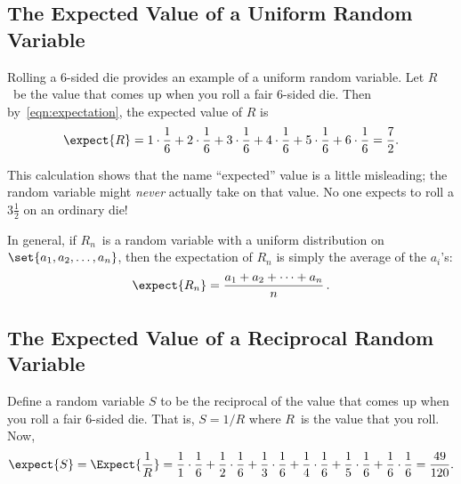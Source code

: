 \subsection{The Expected Value of a Uniform Random Variable}

Rolling a 6-sided die provides an example of a uniform random
variable.  Let $R$~be the value that comes up when you roll a fair
6-sided die.  Then by~\eqref{eqn:expectation}, the expected value of
$R$ is
\[
\expect{R}
     = 1 \cdot \frac{1}{6} + 2 \cdot \frac{1}{6} + 3 \cdot \frac{1}{6} +
        4 \cdot \frac{1}{6} + 5 \cdot \frac{1}{6} + 6 \cdot \frac{1}{6}
     = \frac{7}{2}.
\]

\iffalse
\begin{align*}
\expect{R}
    & = \sum_{k=1}^6 k \cdot \frac{1}{6} \\
    & = 1 \cdot \frac{1}{6} + 2 \cdot \frac{1}{6} + 3 \cdot \frac{1}{6} +
        4 \cdot \frac{1}{6} + 5 \cdot \frac{1}{6} + 6 \cdot \frac{1}{6} \\
    & = \frac{7}{2}
\end{align*}
\fi

This calculation shows that the name ``expected'' value is a little
misleading; the random variable might \emph{never} actually take on that
value.  No one expects to roll a $3 \frac{1}{2}$ on an ordinary
die!

In general, if $R_n$~is a random variable with a uniform distribution
on~$\set{a_1,a_2, \dots, a_n}$, then the expectation of $R_n$ is
simply the average of the $a_i$'s:
\[
\expect{R_n} = \frac{a_1+a_2+\cdots+a_n}{n}\, .
\]

\subsection{The Expected Value of a Reciprocal Random Variable}

Define a random variable $S$ to be the reciprocal of the value that
comes up when you roll a fair 6-sided die.  That is, $S = 1/R$ where
$R$~is the value that you roll.  Now,
\[
\expect{S}  =\Expect{\frac{1}{R}}
            = \frac{1}{1} \cdot \frac{1}{6}
               + \frac{1}{2} \cdot \frac{1}{6}
               + \frac{1}{3} \cdot \frac{1}{6}
               + \frac{1}{4} \cdot \frac{1}{6}
               + \frac{1}{5} \cdot \frac{1}{6}
               + \frac{1}{6} \cdot \frac{1}{6}
               = \frac{49}{120}.
\]

\iffalse
\begin{align*}
\expect{S} & =\expect{\frac{1}{R}}\\
           &  = \frac{1}{1} \cdot \frac{1}{6}
+ \frac{1}{2} \cdot \frac{1}{6}
+ \frac{1}{3} \cdot \frac{1}{6}
+ \frac{1}{4} \cdot \frac{1}{6}
+ \frac{1}{5} \cdot \frac{1}{6}
+ \frac{1}{6} \cdot \frac{1}{6} %
= \frac{49}{120}.
\end{align*}
\fi

